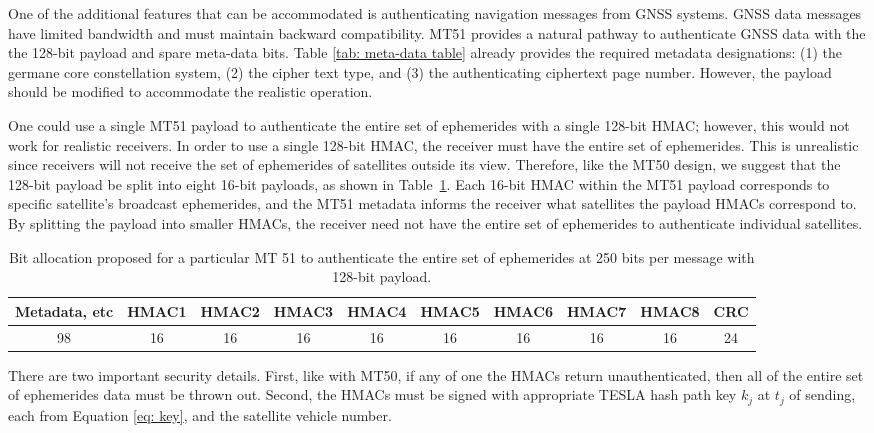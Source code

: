 \documentclass[letterpaper,times]{IONconf/IONconf}
\begin{document}
One of the additional features that can be accommodated is authenticating navigation messages from GNSS systems.
GNSS data messages have limited bandwidth and must maintain backward compatibility.
MT51 provides a natural pathway to authenticate GNSS data with the the 128-bit payload and spare meta-data bits.
Table \ref{tab: meta-data table} already provides the required metadata designations: (1) the germane core constellation system, (2) the cipher text type, and (3) the authenticating ciphertext page number.
However, the payload should be modified to accommodate the realistic operation.

One could use a single MT51 payload to authenticate the entire set of ephemerides with a single 128-bit HMAC; however, this would not work for realistic receivers.
In order to use a single 128-bit HMAC, the receiver must have the entire set of ephemerides.
This is unrealistic since receivers will not receive the set of ephemerides of satellites outside its view.
Therefore, like the MT50 design, we suggest that the 128-bit payload be split into eight 16-bit payloads, as shown in Table~\ref{tab: nma}.
Each 16-bit HMAC within the MT51 payload corresponds to specific satellite's broadcast ephemerides, and the MT51 metadata informs the receiver what satellites the payload HMACs correspond to.
By splitting the payload into smaller HMACs, the receiver need not have the entire set of ephemerides to authenticate individual satellites.

\begin{table}[H]
\center
\begin{tabular}{|c|c|c|c|c|c|c|c|c|c|} \hline
	Metadata, etc & HMAC1 & HMAC2 & HMAC3 & HMAC4 & HMAC5 & HMAC6 & HMAC7 & HMAC8 & CRC \\ \hline
	98 & 16 & 16 & 16 & 16& 16 & 16 & 16 & 16 & 24 \\ \hline
\end{tabular}
\caption{Bit allocation proposed for a particular MT 51 to authenticate the entire set of ephemerides at 250 bits per message with 128-bit payload.}
\label{tab: nma}
\end{table}

There are two important security details.
First, like with MT50, if any of one the HMACs return unauthenticated, then all of the entire set of ephemerides data must be thrown out.
Second, the HMACs must be signed with appropriate TESLA hash path key $k_j$ at $t_j$ of sending, each from Equation \eqref{eq: key}, and the satellite vehicle number.
\end{document}
